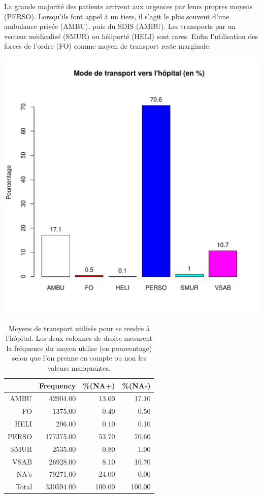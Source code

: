 \documentclass[12pt,english,french,twoside]{report}\usepackage[]{graphicx}\usepackage[]{color}
\makeatletter
\def\maxwidth{ %
  \ifdim\Gin@nat@width>\linewidth
    \linewidth
  \else
    \Gin@nat@width
  \fi
}
\makeatother
\begin{document}
La grande majorité des patients arrivent aux urgences par leurs propres moyens (PERSO). Lorsqu'ils font appel à un tiers, il s'agit le plus souvent d'une ambulance privée (AMBU), puis du SDIS (AMBU). Les transports par un vecteur médicalisé (SMUR) ou héliporté (HELI) sont rares. Enfin l'utilisation des forces de l'ordre (FO) comme moyen de transport reste marginale.


\includegraphics[width=\maxwidth]{figure/transport} 
\begin{table}[ht]
\centering
\begin{tabular}{rrrr}
  \hline
 & Frequency &   \%(NA+) &   \%(NA-) \\ 
  \hline
AMBU & 42904.00 & 13.00 & 17.10 \\ 
  FO & 1375.00 & 0.40 & 0.50 \\ 
  HELI & 206.00 & 0.10 & 0.10 \\ 
  PERSO & 177375.00 & 53.70 & 70.60 \\ 
  SMUR & 2535.00 & 0.80 & 1.00 \\ 
  VSAB & 26928.00 & 8.10 & 10.70 \\ 
  NA's & 79271.00 & 24.00 & 0.00 \\ 
    Total & 330594.00 & 100.00 & 100.00 \\ 
   \hline
\end{tabular}
\caption[Moyens de transport]{Moyens de transport utilisés pour se rendre à l'hôpital. Les deux colonnes de droite mesurent la fréquence du moyen utilise (en pourcentage) selon que l'on prenne en compte ou non les valeurs manquantes. } 
\label{transport}
\end{table}
\end{document}
